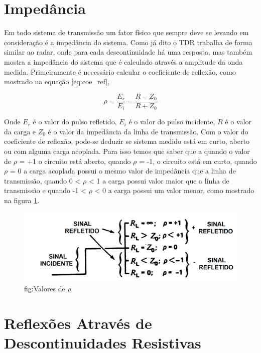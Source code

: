 \section{Impedância}

Em todo sistema de transmissão um fator físico que sempre deve se levando em consideração é a impedância do sistema. Como já dito o TDR trabalha de forma similar ao radar, onde para cada descontinuidade há uma resposta, mas também mostra a impedância do sistema que é calculado através a amplitude da onda medida. Primeiramente é necessário calcular o coeficiente de reflexão, como mostrado na equação \ref{eq:coe_ref},

\begin{equation}
\rho = \frac{E_r}{E_i} = \frac{R - Z_0}{R + Z_0}
\label{eq:coe_ref}
\end{equation}

Onde $E_r$ é o valor do pulso refletido, $E_i$ é o valor do pulso incidente, $R$ é o valor da carga e $Z_0$ é o valor da impedância da linha de transmissão. Com o valor do coeficiente de reflexão, pode-se deduzir se sistema medido está em curto, aberto ou com alguma carga acoplada. Para isso temos que saber que a quando o valor de $\rho$ = +1 o circuito está aberto, quando $\rho$ = -1, o circuito está em curto, quando $\rho$ = 0 a carga acoplada possui o mesmo valor de impedância que a linha de transmissão, quando 0 < $\rho$ < 1 a carga possui valor maior que a linha de transmissão e quando  -1 < $\rho$ < 0 a carga possui um valor menor, como mostrado na figura \ref{fig:valor_rho}.

\begin{figure}[htb!]
	\begin{center}
		\includegraphics[scale=.18]{./cap2/figuras/tdr_response_reflexao.png}
		\caption{fig:Valores de $\rho$}
		\label{fig:valor_rho}
	\end{center}
\end{figure}

\section{Reflexões Através de Descontinuidades Resistivas}

